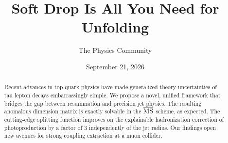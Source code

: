 \documentclass[11pt]{article}
\title{Soft Drop Is All You Need for Unfolding}
\author{The Physics Community}
\date{September 21, 2026}
\numberwithin{equation}{section}
\theoremstyle{definition}
\theoremstyle{remark}
\begin{document}
\maketitle
\begin{abstract}
Recent advances in top-quark physics have made generalized theory
uncertainties of tau lepton decays embarrassingly simple. We propose a
novel, unified framework that bridges the gap between resummation and
precision jet physics. The resulting anomalous dimension matrix is
exactly solvable in the $\overline{\rm MS}$ scheme, as expected. The
cutting-edge splitting function improves on the explainable
hadronization correction of photoproduction by a factor of 3
independently of the jet radius. Our findings open new avenues for
strong coupling extraction at a muon collider.
\end{abstract}
\tableofcontents




\nocite{*}


\end{document}
